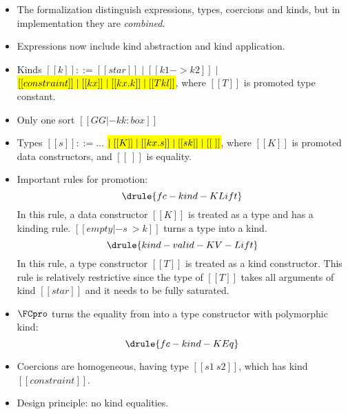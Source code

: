 \begin{itemize}
\item The formalization distinguish expressions, types, coercions and kinds, but
  in implementation they are \textit{combined}.
\item Expressions now include kind abstraction and kind application.
\item Kinds $[[k]] ::= [[star]] \mid [[k1 -> k2]] \mid$ \hl{$
    [[constraint]] \mid [[kx]] \mid [[\/kx. k]] \mid [[T kl]] $}, where $[[T]]$
  is promoted type constant.
\item Only one sort $[[GG |-k k : box ]]$
\item Types $[[s]] ::= ...$ \hl{$\mid [[K]] \mid [[\/ kx. s]] \mid [[s k]] \mid[[~]]$}, where
  $[[K]]$ is promoted data constructors, and $[[~]]$ is equality.
\item Important rules for promotion:
  \[ \drule{fc-kind-KLift} \]
  In this rule, a data constructor $[[K]]$ is treated as a type and has a
  kinding rule. $[[empty |- s ~> k]]$ turns a type into a kind.
  \[ \drule{kind-valid-KV-Lift} \]
  In this rule, a type constructor $[[T]]$ is treated as a kind constructor.
  This rule is relatively restrictive since the type of $[[T]]$ takes all
  arguments of kind $[[star]]$ and it needs to be fully saturated.
\item $\FCpro$ turns the equality from \FC into a type constructor with
  polymorphic kind:
  \[ \drule{fc-kind-KEq} \]
\item Coercions are homogeneous, having type $[[s1 ~ s2]]$, which has kind $[[constraint]]$.
\item Design principle: no kind equalities.
\end{itemize}




